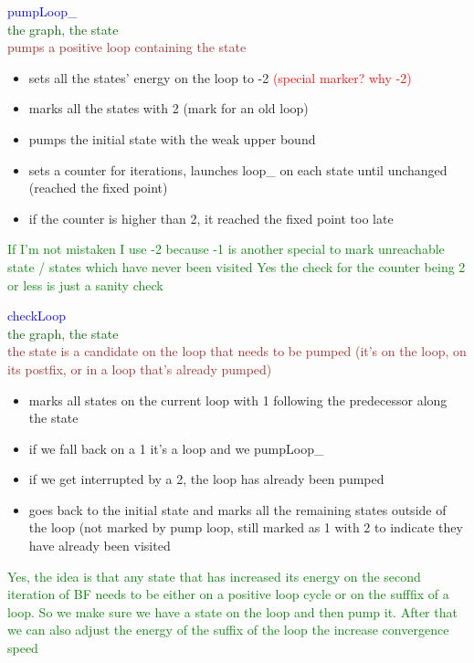 \documentclass{rapport}
\newcommand{\pscrep}[1]{\textcolor{green}{#1}}
\begin{document}
\textcolor{blue}{pumpLoop_}\\
\textcolor[HTML]{006400}{the graph, the state}\\
\textcolor{brown}{pumps a positive loop containing the state}
\begin{itemize}
    \item sets all the states’ energy on the loop to -2 \textcolor{red}{(special marker? why -2)}
    \item marks all the states with 2 (mark for an old loop)
    \item pumps the initial state with the weak upper bound
    \item sets a counter for iterations, launches loop\_ on each state until unchanged (reached the fixed point)
    \item if the counter is higher than 2, it reached the fixed point too late
\end{itemize}
\pscrep{If I'm not mistaken I use -2 because -1 is another special to mark unreachable state / states which have never been visited}
\pscrep{Yes the check for the counter being 2 or less is just a sanity check}


\vspace{12pt}

\textcolor{blue}{checkLoop}\\
\textcolor[HTML]{006400}{the graph, the state}\\
\textcolor{brown}{the state is a candidate on the loop that needs to be pumped (it’s on the loop, on its postfix, or in a loop that’s already pumped)}
\begin{itemize}
    \item marks all states on the current loop with 1 following the predecessor along the state
    \item if we fall back on a 1 it’s a loop and we pumpLoop\_
    \item if we get interrupted by a 2, the loop has already been pumped
    \item goes back to the initial state and marks all the remaining states outside of the loop (not marked by pump loop, still marked as 1 with 2 to indicate they have already been visited
\end{itemize}

\pscrep{Yes, the idea is that any state that has increased its energy on the second
iteration of BF needs to be either on a positive loop cycle or on the sufffix of a loop.
So we make sure we have a state on the loop and then pump it.
After that we can also adjust the energy of the suffix of the loop
the increase convergence speed}
\end{document}

